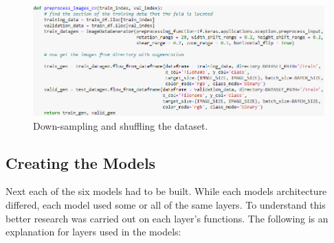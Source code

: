 \begin{figure}[H]
    \centering
    \includegraphics[width=\textwidth]{figures/image-preprocessing.png}
    \caption{Down-sampling and shuffling the dataset.}
    \label{fig:image-preprocessing}
\end{figure}

\subsection{Creating the Models}
Next each of the six models had to be built. While each models architecture differed, each model used some or all of the same layers. To understand this better research was carried out on each layer's functions. The following is an explanation for layers used in the models:

